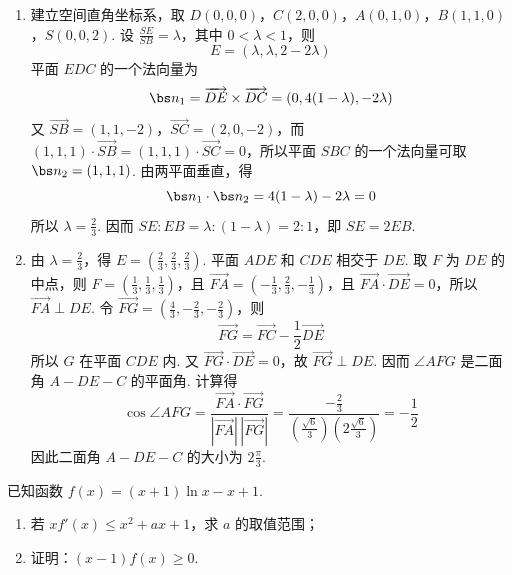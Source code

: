 \begin{solution}
\begin{enumerate}
\item 建立空间直角坐标系，取
\(D(0,0,0)\)，\(C(2,0,0)\)，\(A(0,1,0)\)，\(B(1,1,0)\)，\(S(0,0,2)\). 设
\(\frac{SE}{SB}=\lambda\)，其中 \(0<\lambda<1\)，则
\[
E=\left(\lambda,\lambda,2-2\lambda\right)
\]
平面 \(EDC\) 的一个法向量为
\[
\bs n_{1}=\overrightarrow{DE}\times\overrightarrow{DC}
=\left(0,4(1-\lambda),-2\lambda\right)
\]
又
\(\overrightarrow{SB}=(1,1,-2)\)，\(\overrightarrow{SC}=(2,0,-2)\)，而
\((1,1,1)\cdot\overrightarrow{SB}=(1,1,1)\cdot\overrightarrow{SC}=0\)，所以平面 \(SBC\) 的一个法向量可取
\(\bs n_{2}=(1,1,1)\). 由两平面垂直，得
\[
\bs n_{1}\cdot\bs n_{2}=4(1-\lambda)-2\lambda=0
\]
所以 \(\lambda=\frac{2}{3}\). 因而 \(SE:EB=\lambda:(1-\lambda)=2:1\)，即
\(SE=2EB\).
\item 由 \(\lambda=\frac{2}{3}\)，得 \(E=(\frac{2}{3},\frac{2}{3},\frac{2}{3})\). 平面 \(ADE\) 和
 \(CDE\) 相交于 \(DE\). 取 \(F\) 为 \(DE\) 的中点，则
\(F=(\frac{1}{3},\frac{1}{3},\frac{1}{3})\)，且
\(\overrightarrow{FA}=(-\frac{1}{3},\frac{2}{3},-\frac{1}{3})\)，且
\(\overrightarrow{FA}\cdot\overrightarrow{DE}=0\)，所以
\(\overrightarrow{FA}\perp DE\). 令
\(\overrightarrow{FG}=(\frac{4}{3},-\frac{2}{3},-\frac{2}{3})\)，则
\[
\overrightarrow{FG}=\overrightarrow{FC}-\frac12\overrightarrow{DE}
\]
所以 \(G\) 在平面 \(CDE\) 内. 又
\(\overrightarrow{FG}\cdot\overrightarrow{DE}=0\)，故 \(\overrightarrow{FG}\perp DE\). 因而
\(\angle AFG\) 是二面角 \(A-DE-C\) 的平面角. 计算得
\[
\cos\angle AFG
=\frac{\overrightarrow{FA}\cdot\overrightarrow{FG}}
{|\overrightarrow{FA}|\,|\overrightarrow{FG}|}
=\frac{-\frac{2}{3}}{(\frac{\sqrt6}{3})(2\frac{\sqrt6}{3})}=-\frac12
\]
因此二面角 \(A-DE-C\) 的大小为 \(2\frac{\pi}{3}\).
\end{enumerate}
\end{solution}

\begin{problem}
已知函数 \( f(x) = (x + 1)\ln x - x + 1 \).
\begin{enumerate}
\item 若 \(x f'(x) \leqslant x^2 + ax + 1\)，求 \(a\) 的取值范围；
\item 证明：\((x - 1)f(x) \geqslant 0\).
\end{enumerate}
\end{problem}

